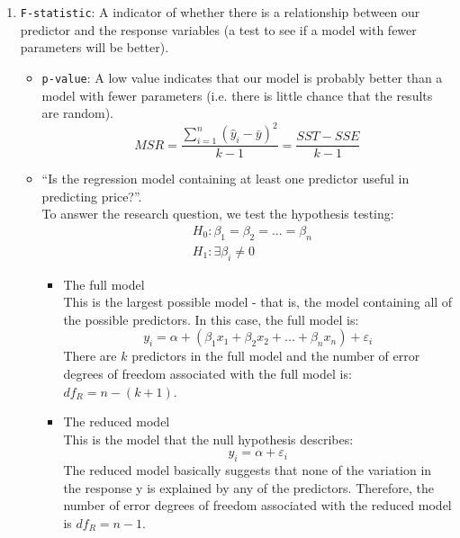 \documentclass[a4paper]{article}
\begin{document}
\begin{enumerate}
    \item \verb|F-statistic|: A indicator of whether there is a relationship between our predictor and the response variables (a test to see if a model with fewer parameters will be better).
    \begin{itemize}
        \item \verb|p-value|: A low value indicates that our model is probably better than a model with fewer parameters (i.e. there is little chance that the results are random).
        \begin{equation*}
            MSR = \dfrac{\sum_{i=1}^n(\hat{y}_i-\bar{y})^2}{k-1} = \dfrac{SST-SSE}{k-1}
        \end{equation*}
        
        \item “Is the regression model containing at least one predictor useful in predicting price?”.\\
        To answer the research question, we test the hypothesis testing:
        \begin{align*}
            &H_0:\beta_1=\beta_2=...=\beta_n\\
            &H_1:\exists \beta_i \ne 0
        \end{align*}
        \begin{itemize}
            \item The full model\\
            This is the largest possible model - that is, the model containing all of the possible predictors. In this case, the full model is:
            \begin{equation*}
                y_i = \alpha + (\beta_1 x_1 + \beta_2 x_2 +...+\beta_n x_n) + \varepsilon_i
            \end{equation*}
            There are $k$ predictors in the full model and the number of error degrees of freedom associated with the full model is: $df_R=n-(k+1)$.
            \item The reduced model\\
            This is the model that the null hypothesis describes:
            \begin{equation*}
                y_i = \alpha + \varepsilon_i
            \end{equation*}
            The reduced model basically suggests that none of the variation in the response y is explained by any of the predictors. Therefore, the number of error degrees of freedom associated with the reduced model is $df_R=n-1$.\\

\end{itemize}
\end{itemize}
\end{enumerate}
\end{document}
